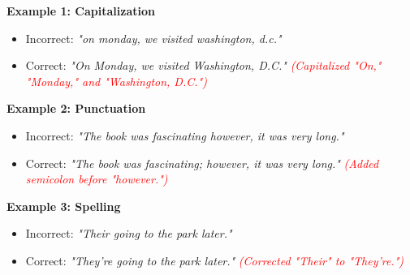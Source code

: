\documentclass[12pt]{article}
\begin{document}
\begin{tcolorbox}[colframe=black!60, colback=white, 
coltitle=black, colbacktitle=black!15, fonttitle=\bfseries\Large, 
title=Examples, halign title=center, left=10pt, right=10pt, top=10pt, bottom=15pt]

\textbf{Example 1: Capitalization}
\begin{itemize}
    \item Incorrect: \textit{"on monday, we visited washington, d.c."}  
    \item Correct: \textit{"On Monday, we visited Washington, D.C."} \textcolor{red}{\textit{(Capitalized "On," "Monday," and "Washington, D.C.")}}
\end{itemize}

\textbf{Example 2: Punctuation}
\begin{itemize}
    \item Incorrect: \textit{"The book was fascinating however, it was very long."}  
    \item Correct: \textit{"The book was fascinating; however, it was very long."} \textcolor{red}{\textit{(Added semicolon before "however.")}}
\end{itemize}

\textbf{Example 3: Spelling}
\begin{itemize}
    \item Incorrect: \textit{"Their going to the park later."}  
    \item Correct: \textit{"They're going to the park later."} \textcolor{red}{\textit{(Corrected "Their" to "They're.")}}
\end{itemize}

\end{tcolorbox}

\vspace{1em}
\end{document}
